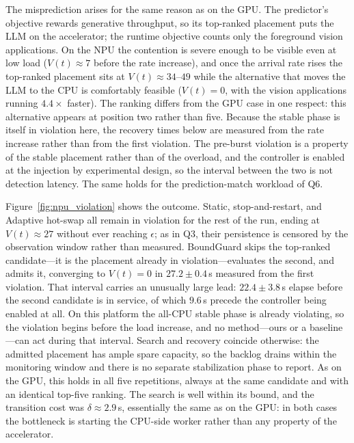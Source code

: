 \documentclass[conference]{IEEEtran}
\begin{document}
{{The misprediction arises for the same reason as on the GPU. The predictor's objective rewards generative throughput, so its top-ranked placement puts the LLM on the accelerator; the runtime objective counts only the foreground vision applications. On the NPU the contention is severe enough to be visible even at low load ($V(t)\approx7$ before the rate increase), and once the arrival rate rises the top-ranked placement sits at $V(t)\approx34$--$49$ while the alternative that moves the LLM to the CPU is comfortably feasible ($V(t)=0$, with the vision applications running $4.4\times$ faster). The ranking differs from the GPU case in one respect: this alternative appears at position two rather than five. Because the stable phase is itself in violation here, the recovery times below are measured from the rate increase rather than from the first violation. The pre-burst violation is a property of the stable placement rather than of the overload, and the controller is enabled at the injection by experimental design, so the interval between the two is not detection latency. The same holds for the prediction-match workload of Q6.

Figure~\ref{fig:npu_violation} shows the outcome. Static, stop-and-restart, and Adaptive hot-swap all remain in violation for the rest of the run, ending at $V(t)\approx27$ without ever reaching $\epsilon$; as in Q3, their persistence is censored by the observation window rather than measured. BoundGuard skips the top-ranked candidate---it is the placement already in violation---evaluates the second, and admits it, converging to $V(t)=0$ in $27.2\pm0.4$\,s measured from the first violation. That interval carries an unusually large lead: $22.4\pm3.8$\,s elapse before the second candidate is in service, of which $9.6$\,s precede the controller being enabled at all. On this platform the all-CPU stable phase is already violating, so the violation begins before the load increase, and no method---ours or a baseline---can act during that interval. Search and recovery coincide otherwise: the admitted placement has ample spare capacity, so the backlog drains within the monitoring window and there is no separate stabilization phase to report. As on the GPU, this holds in all five repetitions, always at the same candidate and with an identical top-five ranking. The search is well within its bound, and the transition cost was $\delta\approx2.9$\,s, essentially the same as on the GPU: in both cases the bottleneck is starting the CPU-side worker rather than any property of the accelerator.

}}
\end{document}
